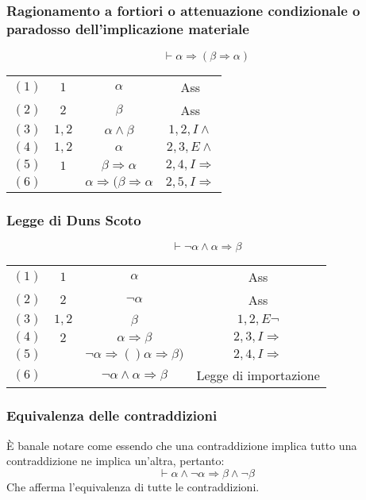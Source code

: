 \subsubsection{Ragionamento a fortiori o attenuazione condizionale o paradosso dell'implicazione materiale}
\begin{equation}
\vdash\alpha\Rightarrow(\beta\Rightarrow\alpha)
\end{equation}
\begin{tabular}{c c c c}
$(1)$& $1$ & $\alpha$ & Ass\\
$(2)$& $2$ & $\beta$ & Ass\\
$(3)$ & $1, 2$ & $\alpha\land\beta$& $1,2, I\land$\\
$(4)$ & $1, 2$ & $\alpha$ & $2,3, E\land$\\
$(5)$ &$1$ & $\beta\Rightarrow\alpha$ & $2,4,I\Rightarrow$\\
$(6)$ & & $\alpha\Rightarrow(\beta\Rightarrow\alpha$ & $2, 5, I\Rightarrow$\\
\end{tabular}
\subsubsection{Legge di Duns Scoto}
\begin{equation}
\vdash\neg\alpha\land\alpha\Rightarrow\beta
\end{equation}
\begin{tabular}{c c c c}
$(1)$& $1$ & $\alpha$ & Ass\\
$(2)$& $2$ & $\neg\alpha$ & Ass\\
$(3)$ & $1, 2$ & $\beta$& $1,2, E\neg$\\
$(4)$ & $2$ & $\alpha\Rightarrow\beta$ & $2,3, I\Rightarrow$\\
$(5)$ &  & $\neg\alpha\Rightarrow()\alpha\Rightarrow\beta)$ & $2,4,I\Rightarrow$\\
$(6)$ & & $\neg\alpha\land\alpha\Rightarrow\beta$ & Legge di importazione\\
\end{tabular}
\subsubsection{Equivalenza delle contraddizioni}
\`E banale notare come essendo che una contraddizione implica tutto una contraddizione ne implica un'altra, pertanto:
\begin{equation}
\vdash\alpha\land\neg\alpha\Rightarrow\beta\land\neg\beta
\end{equation}
Che afferma l'equivalenza di tutte le contraddizioni. 
